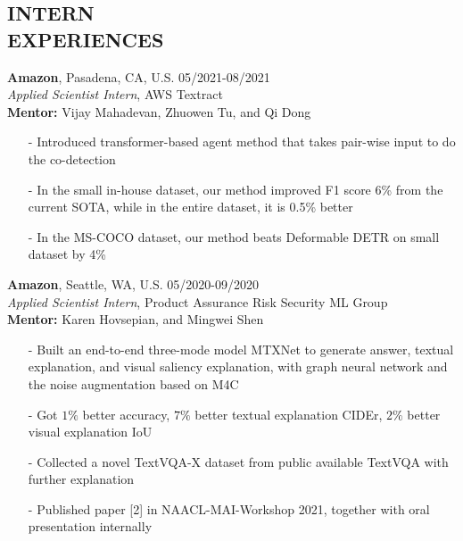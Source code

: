 \documentclass[margin]{res}
\begin{document}
\begin{resume}
\section{INTERN \\ EXPERIENCES}
				\textbf{Amazon}, Pasadena, CA, U.S. \hfill 05/2021-08/2021\\
                {\it Applied Scientist Intern}, AWS Textract\\
                \textbf{Mentor:} Vijay Mahadevan, Zhuowen Tu, and Qi Dong
                \begin{itemize}\itemsep -2.2pt %
                \item[-] Introduced transformer-based agent method that takes pair-wise input to do the co-detection
                \item[-] In the small in-house dataset, our method improved F1 score 6\% from the current SOTA, while in the entire dataset, it is 0.5\% better
                \item[-] In the MS-COCO dataset, our method beats Deformable DETR on small dataset by 4\% 
                 \end{itemize}
                
                \vspace{-1em}
                \textbf{Amazon}, Seattle, WA, U.S. \hfill 05/2020-09/2020\\
                {\it Applied Scientist Intern}, Product Assurance Risk Security ML Group\\
                \textbf{Mentor:} Karen Hovsepian, and Mingwei Shen
                \begin{itemize}\itemsep -2.2pt %
                \item[-] Built an end-to-end three-mode model MTXNet to generate answer, textual explanation, and visual saliency explanation, with graph neural network and the noise augmentation based on M4C
                \item[-] Got $1\%$ better accuracy, $7\%$ better textual explanation CIDEr, $2\%$ better visual explanation IoU
                 \item[-] Collected a novel TextVQA-X dataset from public available TextVQA with further explanation
                 \item[-] Published paper [2] in NAACL-MAI-Workshop 2021, together with oral presentation internally
                 \end{itemize}
                

\end{resume}
\end{document}
